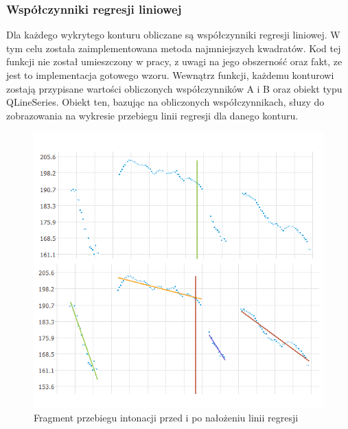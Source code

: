 \documentclass[a4paper,12 pt]{article}
\begin{document}
\subsubsection{Współczynniki regresji liniowej}
Dla każdego wykrytego konturu obliczane są współczynniki regresji liniowej. W tym celu została zaimplementowana metoda najmniejszych kwadratów.
Kod tej funkcji nie został umieszczony w pracy, z uwagi na jego obszerność oraz fakt, ze jest to  implementacja gotowego wzoru. Wewnątrz funkcji, każdemu konturowi zostają przypisane wartości obliczonych współczynników A i B oraz obiekt typu QLineSeries. Obiekt ten, bazując na obliczonych współczynnikach, słuzy do zobrazowania na wykresie przebiegu linii regresji dla danego konturu.
 \FloatBarrier
\begin{figure}[h]
\centering
\includegraphics[scale=0.7]{regresja.png}
\caption{Fragment przebiegu intonacji przed i po nałożeniu linii regresji}
\end{figure}
\FloatBarrier
\end{document}
